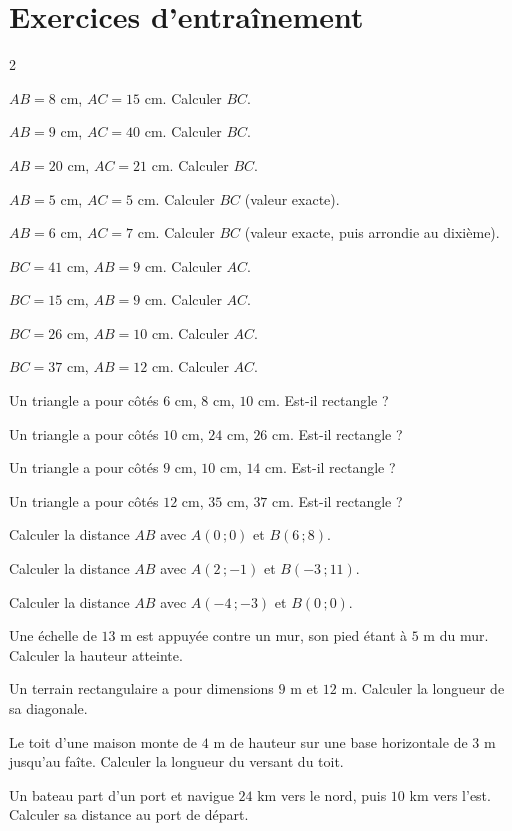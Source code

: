 \section{Exercices d'entraînement}
\begin{multicols}{2}

\exo{} $AB=8$ cm, $AC=15$ cm. Calculer $BC$.

\exo{} $AB=9$ cm, $AC=40$ cm. Calculer $BC$.

\exo{} $AB=20$ cm, $AC=21$ cm. Calculer $BC$.

\exo{} $AB=5$ cm, $AC=5$ cm. Calculer $BC$ (valeur exacte).

\exo{} $AB=6$ cm, $AC=7$ cm. Calculer $BC$ (valeur exacte, puis arrondie au
dixième).

\exo{} $BC=41$ cm, $AB=9$ cm. Calculer $AC$.

\exo{} $BC=15$ cm, $AB=9$ cm. Calculer $AC$.

\exo{} $BC=26$ cm, $AB=10$ cm. Calculer $AC$.

\exo{} $BC=37$ cm, $AB=12$ cm. Calculer $AC$.

\exo{} Un triangle a pour côtés $6$ cm, $8$ cm, $10$ cm. Est-il rectangle ?

\exo{} Un triangle a pour côtés $10$ cm, $24$ cm, $26$ cm. Est-il rectangle ?

\exo{} Un triangle a pour côtés $9$ cm, $10$ cm, $14$ cm. Est-il rectangle ?

\exo{} Un triangle a pour côtés $12$ cm, $35$ cm, $37$ cm. Est-il rectangle ?

\exo{} Calculer la distance $AB$ avec $A(0\,;0)$ et $B(6\,;8)$.

\exo{} Calculer la distance $AB$ avec $A(2\,;-1)$ et $B(-3\,;11)$.

\exo{} Calculer la distance $AB$ avec $A(-4\,;-3)$ et $B(0\,;0)$.

\exo{} Une échelle de $13$ m est appuyée contre un mur, son pied étant à $5$ m du
mur. Calculer la hauteur atteinte.

\exo{} Un terrain rectangulaire a pour dimensions $9$ m et $12$ m. Calculer la
longueur de sa diagonale.

\exo{} Le toit d'une maison monte de $4$ m de hauteur sur une base horizontale de
$3$ m jusqu'au faîte. Calculer la longueur du versant du toit.

\exo{} Un bateau part d'un port et navigue $24$ km vers le nord, puis $10$ km vers
l'est. Calculer sa distance au port de départ.

\end{multicols}

